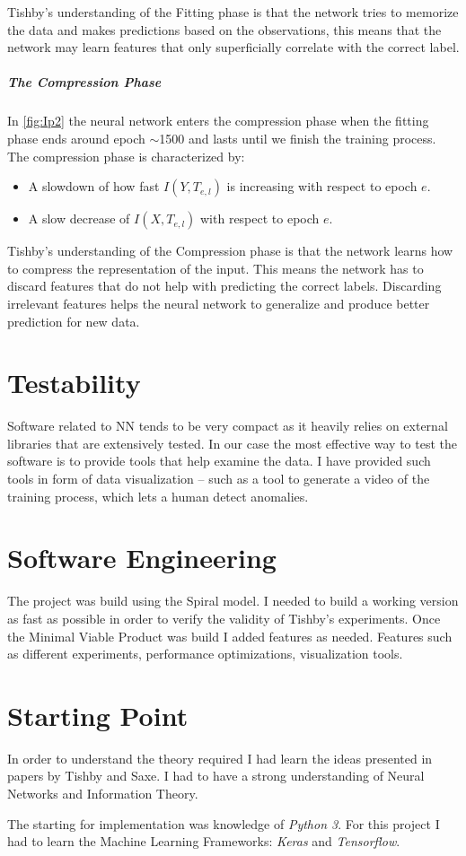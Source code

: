 \documentclass[dissertation.tex]{subfiles}
\begin{document}
Tishby's understanding of the Fitting phase is that the network tries to
memorize the data and makes predictions based on the observations, this means
that the network may learn features that only superficially correlate with the
correct label.

\subparagraph{The Compression Phase} In \autoref{fig:Ip2} the neural network
enters the compression phase when the fitting phase ends around epoch $\sim$1500
and lasts until we finish the training process. The compression phase is
characterized by:
\begin{itemize}
  \item{
      A slowdown of how fast $I(Y, T_{e,l})$ is increasing with respect to epoch
      $e$. 
    }
  \item{
      A slow decrease of $I(X, T_{e,l})$ with respect to epoch $e$.
    }
\end{itemize}

Tishby's understanding of the Compression phase is that the network learns how
to compress the representation of the input. This means the network has to
discard features that do not help with predicting the correct labels. Discarding
irrelevant features helps the neural network to generalize and produce better
prediction for new data.

\section{Testability}

Software related to NN tends to be very compact as it heavily relies on external
libraries that are extensively tested. In our case the most effective way to
test the software is to provide tools that help examine the data. I have
provided such tools in form of data visualization -- such as a tool to generate
a video of the training process, which lets a human detect anomalies.

\section{Software Engineering}

The project was build using the Spiral model. I needed to build a working
version as fast as possible in order to verify the validity of Tishby's
experiments. Once the Minimal Viable Product was build I added features as
needed. Features such as different experiments, performance optimizations,
visualization tools.

\section{Starting Point}

In order to understand the theory required I had learn the ideas presented in
papers by Tishby\cite{TISHBY}\cite{TISHBY2} and Saxe\cite{SAXE}. I had to have a
strong understanding of Neural Networks and Information Theory.

The starting for implementation was knowledge of \emph{Python 3}. For this
project I had to learn the Machine Learning Frameworks: \emph{Keras} and
\emph{Tensorflow}.
\end{document}
